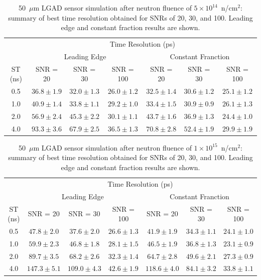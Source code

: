 \documentclass[preprint,1p]{elsarticle}
\begin{document}
 \begin{table}\label{tab:shaping_time_5e14}
     \begin{tabular}{c|ccc|ccc}
     \multicolumn{1}{c}{}& \multicolumn{6}{c}{Time Resolution (ps)} \\
     \multicolumn{1}{c}{}&\multicolumn{3}{c}{Leading Edge} & \multicolumn{3}{c}{Constant Franction}\\ \hline
     ST (ns) & SNR = 20   & SNR = 30      & SNR = 100     & SNR = 20      & SNR = 30      & SNR = 100 \\
     0.5 & $36.8 \pm 1.9$  & $32.0 \pm 1.3$  & $26.0 \pm 1.2$  & $32.5 \pm 1.4$  & $30.6 \pm 1.2$  & $25.1 \pm 1.2$ \\
     1.0 & $40.9 \pm 1.4$  & $33.8 \pm 1.1$  & $29.2 \pm 1.0$  & $33.4 \pm 1.5$  & $30.9 \pm 0.9$  & $26.1 \pm 1.3$ \\
     2.0 & $56.9 \pm 2.4$  & $45.3 \pm 2.2$  & $30.1 \pm 1.1$  & $43.7 \pm 1.6$  & $36.9 \pm 1.3$  & $24.4 \pm 1.0$ \\
     4.0 & $93.3 \pm 3.6$  & $67.9 \pm 2.5$  & $36.5 \pm 1.3$  & $70.8 \pm 2.8$  & $52.4 \pm 1.9$  & $29.9 \pm 1.9$ \\
     \end{tabular}
     \caption{50~$\mu$m LGAD sensor simulation after neutron fluence of
      $5\times 10^{14}$~n/cm$^2$: summary of best time resolution obtained for SNRs
     of 20, 30, and 100. Leading edge and constant fraction results are shown.}
  \end{table}

  \begin{table}\label{tab:shaping_time_1e_15}
      \begin{tabular}{c|ccc|ccc}
      \multicolumn{1}{c}{}& \multicolumn{6}{c}{Time Resolution (ps)} \\
      \multicolumn{1}{c}{}&\multicolumn{3}{c}{Leading Edge} & \multicolumn{3}{c}{Constant Franction}\\ \hline
      ST (ns) & SNR = 20   & SNR = 30      & SNR = 100     & SNR = 20      & SNR = 30      & SNR = 100 \\
      0.5 & $47.8 \pm 2.0$  & $37.6 \pm 2.0$  & $26.6 \pm 1.3$  & $41.9 \pm 1.9$  & $34.3 \pm 1.1$  & $24.1 \pm 1.0$ \\
      1.0 & $59.9 \pm 2.3$  & $46.8 \pm 1.8$  & $28.1 \pm 1.5$  & $46.5 \pm 1.9$  & $36.8 \pm 1.3$  & $23.1 \pm 0.9$ \\
      2.0 & $89.7 \pm 3.5$  & $68.2 \pm 2.6$  & $32.3 \pm 1.4$  & $64.7 \pm 2.8$  & $49.6 \pm 2.1$  & $27.3 \pm 0.9$ \\
      4.0 & $147.3 \pm 5.1$  & $109.0 \pm 4.3$  & $42.6 \pm 1.9$  & $118.6 \pm 4.0$  & $84.1 \pm 3.2$  & $33.8 \pm 1.1$ \\
      \end{tabular}
      \caption{50~$\mu$m LGAD sensor simulation after neutron fluence of
       $1\times 10^{15}$~n/cm$^2$: summary of best time resolution obtained for SNRs
      of 20, 30, and 100. Leading edge and constant fraction results are shown.}
   \end{table}
\end{document}
